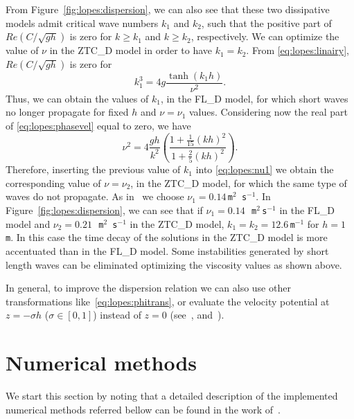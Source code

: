 \noindent From Figure~\ref{fig:lopes:dispersion}, we can also see that
these two dissipative models admit critical wave numbers
$k_1$ and $k_2$, such that the positive part of
$\displaystyle Re\left(C/\sqrt{gh}\right)$ is zero for
$k\geqslant k_1$ and $k\geqslant k_2$, respectively.
We can optimize the value of $\nu$ in the ZTC\_D model in
order to have $k_1=k_2$.
From \eqref{eq:lopes:linairy},  $\displaystyle
Re\left(C/\sqrt{gh}\right)$ is zero for
\begin{equation}
k_1^3=4g\frac{\tanh{(k_1h)}}{\nu^2}.
\end{equation}
Thus, we can obtain the values of $k_1$, in the FL\_D model,
for which short waves no longer propagate for fixed $h$ and
$\nu=\nu_1$ values.  Considering now the real part of
\eqref{eq:lopes:phasevel} equal to zero, we have
\begin{equation}\label{eq:lopes:nu1}
\nu^2=4\frac{gh}{k^2}\left(\frac{1+\frac{1}{15}(kh)^2}{1+\frac{2}{5}(kh)^2}\right).
\end{equation}
Therefore, inserting the previous value of $k_1$ into
\eqref{eq:lopes:nu1} we obtain the corresponding value of
$\nu=\nu_2$, in the ZTC\_D model, for which the same type of waves
do not propagate.
As in~\citet{DutykhDias2007} we choose $\nu_1=0.14$\,{\tt m$^2$\,s$^{-1}$}.
In Figure~\ref{fig:lopes:dispersion}, we can
see that if $\nu_1=0.14\,$~{\tt m$^2\,$s$^{-1}$} in
the FL\_D model   and $\nu_2=0.21\,$~{\tt m$^2$\,s$^{-1}$}
in the ZTC\_D model, $k_1=k_2=12.6$\,{\tt m$^{-1}$}
for $h=1$\,{\tt m}.
In this case the time decay of the solutions in
the ZTC\_D model is more accentuated than in the FL\_D
model.
Some instabilities  generated by short length waves can
be eliminated optimizing the viscosity values as shown above.

In general, to improve the dispersion relation we can also
use other transformations like~\eqref{eq:lopes:phitrans}, or
evaluate the velocity potential at $z=-\sigma h$
($\sigma\in[0,1]$) instead of $z=0$
(see~\citet{BinghamMadsenFuhrman2008}, \citet{MadsenAgnon2003}
and~\citet{MadsenBinghamSchaffer2003}).


\section{Numerical methods}\label{sec:lopes:numericalmethods}
We start this section by noting that a detailed description
of the implemented numerical methods referred bellow can be
found in the work of~\citet{Lopes2007}.

